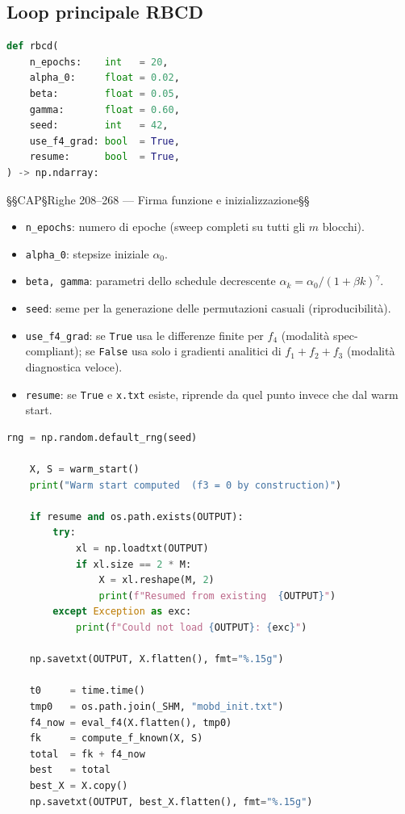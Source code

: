 \documentclass[12pt,a4paper]{article}
\theoremstyle{definition}
\begin{document}
\subsection{Loop principale RBCD}

\begin{lstlisting}[language=Python]
def rbcd(
    n_epochs:    int   = 20,
    alpha_0:     float = 0.02,
    beta:        float = 0.05,
    gamma:       float = 0.60,
    seed:        int   = 42,
    use_f4_grad: bool  = True,
    resume:      bool  = True,
) -> np.ndarray:
\end{lstlisting}

§§CAP§Righe 208–268 — Firma funzione e inizializzazione§§



\begin{itemize}[nosep]
  \item \texttt{n\_epochs}: numero di epoche (sweep completi su tutti gli $m$ blocchi).
  \item \texttt{alpha\_0}: stepsize iniziale $\alpha_0$.
  \item \texttt{beta, gamma}: parametri dello schedule decrescente $\alpha_k = \alpha_0 / (1 + \beta k)^\gamma$.
  \item \texttt{seed}: seme per la generazione delle permutazioni casuali (riproducibilità).
  \item \texttt{use\_f4\_grad}: se \texttt{True} usa le differenze finite per $f_4$
        (modalità spec-compliant); se \texttt{False} usa solo i gradienti analitici di
        $f_1 + f_2 + f_3$ (modalità diagnostica veloce).
  \item \texttt{resume}: se \texttt{True} e \texttt{x.txt} esiste, riprende da quel punto
        invece che dal warm start.
\end{itemize}

\begin{lstlisting}[language=Python]
    rng = np.random.default_rng(seed)

    X, S = warm_start()
    print("Warm start computed  (f3 = 0 by construction)")

    if resume and os.path.exists(OUTPUT):
        try:
            xl = np.loadtxt(OUTPUT)
            if xl.size == 2 * M:
                X = xl.reshape(M, 2)
                print(f"Resumed from existing  {OUTPUT}")
        except Exception as exc:
            print(f"Could not load {OUTPUT}: {exc}")

    np.savetxt(OUTPUT, X.flatten(), fmt="%.15g")

    t0     = time.time()
    tmp0   = os.path.join(_SHM, "mobd_init.txt")
    f4_now = eval_f4(X.flatten(), tmp0)
    fk     = compute_f_known(X, S)
    total  = fk + f4_now
    best   = total
    best_X = X.copy()
    np.savetxt(OUTPUT, best_X.flatten(), fmt="%.15g")
\end{lstlisting}
\end{document}
